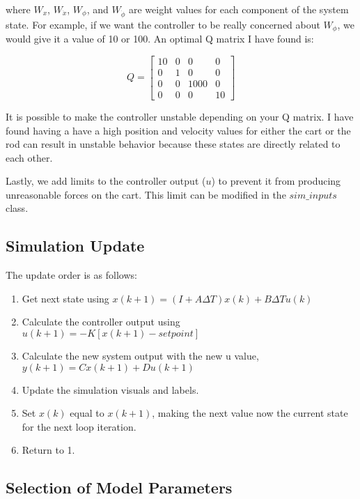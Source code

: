 \documentclass{article}
\begin{document}
\noindent where $W_x$, $W_{\Dot{x}}$,  $W_\phi$, and $W_{\Dot{\phi}}$ are weight values for each component of the system state. For example, if we want the controller to be really concerned about $W_\phi$, we would give it a value of 10 or 100. An optimal Q matrix I have found is:

\begin{equation}
    Q = 
    \begin{bmatrix}
        10 & 0 & 0 & 0 \\
        0 & 1 & 0 & 0 \\
        0 & 0 & 1000 & 0 \\
        0 & 0 & 0 & 10 
    \end{bmatrix}
\end{equation}

\noindent It is possible to make the controller unstable depending on your Q matrix. I have found having a have a high position and velocity values for either the cart or the rod can result in unstable behavior because these states are directly related to each other.

Lastly, we add limits to the controller output ($u$) to prevent it from producing unreasonable forces on the cart. This limit can be modified in the $sim\_inputs$ class. 

\subsection{Simulation Update}

The update order is as follows:

\begin{enumerate}
    \item Get next state using $x(k+1)= (I + A\Delta T)x(k) + B\Delta T u(k)$
    \item Calculate the controller output using $u(k+1)= -K[x(k+1) - setpoint]$
    \item Calculate the new system output with the new u value, \\ $y(k+1) = Cx(k+1)+Du(k+1) $
    \item Update the simulation visuals and labels.
    \item Set $x(k)$ equal to $x(k+1)$, making the next value now the current state for the next loop iteration.
    \item Return to 1.
\end{enumerate}

\subsection{Selection of Model Parameters}
\end{document}
